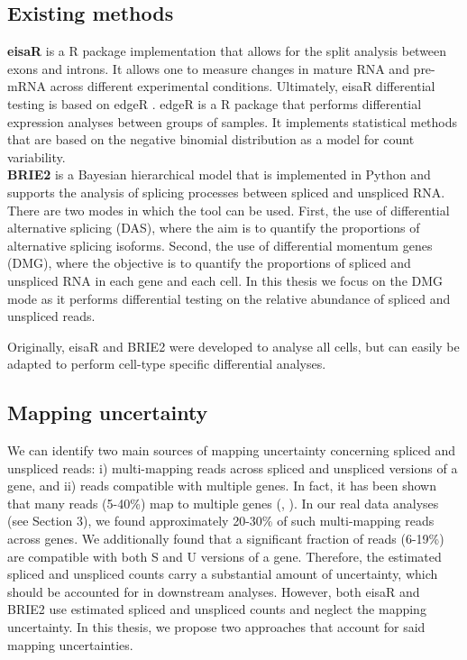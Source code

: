 \subsection{Existing methods}

\textbf{eisaR} \citep{eisar_package} is a R package implementation that allows for the split analysis between exons and introns. It allows one to measure changes in mature RNA and pre-mRNA across different experimental conditions. Ultimately, eisaR differential testing is based on edgeR \citep{edger_package}. edgeR is a R package that performs differential expression analyses between groups of samples. It implements statistical methods that are based on the negative binomial distribution as a model for count variability. \\

\noindent \textbf{BRIE2} \citep{brie2} is a Bayesian hierarchical model that is implemented in Python and supports the analysis of splicing processes between spliced and unspliced RNA. There are two modes in which the tool can be used. First, the use of differential alternative splicing (DAS), where the aim is to quantify the proportions of alternative splicing isoforms. Second, the use of differential momentum genes (DMG), where the objective is to quantify the proportions of spliced and unspliced RNA in each gene and each cell. In this thesis we focus on the DMG mode as it performs differential testing on the relative abundance of spliced and unspliced reads.

Originally, eisaR and BRIE2 were developed to analyse all cells, but can easily be adapted to perform cell-type specific differential analyses.

\subsection{Mapping uncertainty}
We can identify two main sources of mapping uncertainty concerning spliced and unspliced reads: i) multi-mapping reads across spliced and unspliced versions of a gene, and ii) reads compatible with multiple genes. In fact, it has been shown that many reads (5-40\%) map to multiple genes (\cite{mapping1}, \cite{mapping2}). In our real data analyses (see Section 3), we found approximately 20-30\% of such multi-mapping reads across genes. We additionally found that a significant fraction of reads (6-19\%) are compatible with both S and U versions of a gene. Therefore, the estimated spliced and unspliced counts carry a substantial amount of uncertainty, which should be accounted for in downstream analyses. However, both eisaR and BRIE2 use estimated spliced and unspliced counts and neglect the mapping uncertainty. In this thesis, we propose two approaches that account for said mapping uncertainties.
